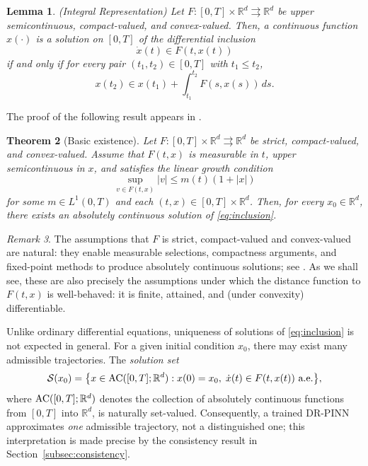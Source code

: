\documentclass[11pt]{elsarticle}
\newtheorem{theorem}{Theorem}[section]
\newtheorem{lemma}[theorem]{Lemma}
\theoremstyle{definition}
\theoremstyle{remark}
\newtheorem{remark}[theorem]{Remark}
\numberwithin{equation}{section}
\begin{document}
	\begin{lemma}{\rm (Integral Representation)} \label{lem:integral_repr}
		Let $F:[0,T] \times \mathbb{R}^d \rightrightarrows \mathbb{R}^d$ be upper semicontinuous, compact-valued, and convex-valued. Then, a continuous function 
		$x(\cdot)$ is a solution on $[0,T]$ of the differential inclusion
		\[
		\dot{x}(t) \in F(t, x(t))
		\]
		if and only if for every pair $(t_1, t_2)\in [0,T]$ with $t_1 \le t_2$,
		\[
		x(t_2) \in x(t_1) + \int_{t_1}^{t_2} F(s, x(s)) \, ds.
		\]
	\end{lemma}
	
	The proof of the following result appears in
	\cite[Theorem~10.5, p.\,138]{deimling_1992}.
	
	\begin{theorem}[Basic existence]\label{thm:existence}
		Let $F:[0,T]\times\mathbb{R}^d\rightrightarrows\mathbb{R}^d$ be
		strict, compact-valued, and convex-valued. 
		Assume that $F(t,x)$ is measurable in $t$, upper semicontinuous in $x$,
		and satisfies the linear growth condition
		\[
		\sup_{v\in F(t,x)}|v|\le m(t)(1+|x|)
		\]
		for some $m\in L^1(0,T)$ and each $(t,x)\in [0,T]\times \mathbb{R}^d$.  Then, for every $x_0\in\mathbb{R}^d$, there
		exists an absolutely continuous solution of \eqref{eq:inclusion}.
	\end{theorem}
	
	\begin{remark}
		The assumptions that $F$ is strict, compact-valued and convex-valued are natural:
		they enable measurable selections, compactness arguments, and fixed-point
		methods to produce absolutely continuous solutions; see
		\cite{aubin_cellina_1984,aubin_frankowska_2009,deimling_1992}.  As we
		shall see, these are also precisely the assumptions under which the
		distance function to $F(t,x)$ is well-behaved: it is finite, attained,
		and (under convexity) differentiable.
	\end{remark}
	
	Unlike ordinary differential equations, uniqueness of solutions of
	\eqref{eq:inclusion} is not expected in general.  For a given initial
	condition $x_0$, there may exist many admissible trajectories.  The
	\emph{solution set}
	\begin{equation}\label{eq:solution-DI}
		\mathcal{S}(x_0)
		=
		\bigl\{
		x\in {\rm AC}([0,T];\mathbb{R}^d):
		x(0)=x_0,\;
		\dot{x}(t)\in F(t,x(t))\ \text{a.e.}
		\bigr\},
	\end{equation}
	where ${\rm AC}([0,T];\mathbb{R}^d)$ denotes the collection of
	absolutely continuous functions from $[0,T]$ into $\mathbb{R}^d$,
	is naturally set-valued.  Consequently, a trained DR-PINN approximates
	\emph{one} admissible trajectory, not a distinguished one; this
	interpretation is made precise by the consistency result in
	Section~\ref{subsec:consistency}.
\end{document}
